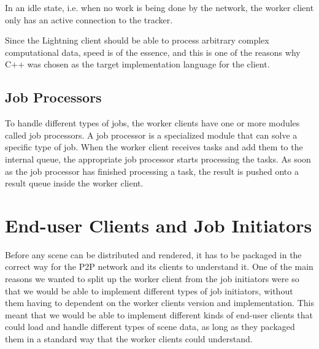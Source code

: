 In an idle state, i.e. when no work is being done by the network, the worker client only has an active connection to the tracker.





Since the Lightning client should be able to process arbitrary complex computational data, speed is of the essence, and this is one of the reasons why C++ was chosen as the target implementation language for the client.

\subsection{Job Processors}
  To handle different types of jobs, the worker clients have one or more modules called job processors. A job processor is a specialized module that can solve a specific type of job. When the worker client receives tasks and add them to the internal queue, the appropriate job processor starts processing the tasks. As soon as the job processor has finished processing a task, the result is pushed onto a result queue inside the worker client.

\section{End-user Clients and Job Initiators}
Before any scene can be distributed and rendered, it has to be packaged in the correct way for the P2P network and its clients to understand it. One of the main reasons we wanted to split up the worker client from the job initiators were so that we would be able to implement different types of job initiators, without them having to dependent on the worker clients version and implementation. This meant that we would be able to implement different kinds of end-user clients that could load and handle different types of scene data, as long as they packaged them in a standard way that the worker clients could understand.

